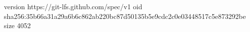 version https://git-lfs.github.com/spec/v1
oid sha256:35b66a31a29a6b6c862ab220bc87d50135b5e9cdc2c0e03448517c5e873292be
size 4052

